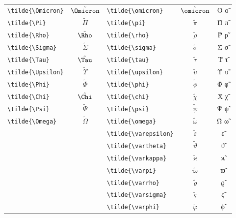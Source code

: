 \documentclass[12pt,a4paper]{article}
\begin{document}
\begin{longtable}{|l|c|l|c|c|}
\verb|\tilde{\Omicron}|    & $\tilde{\Omicron}$ & \verb|\tilde{\omicron}|    & $\tilde{\omicron}$    & Ο̃ ο̃ \\
\verb|\tilde{\Pi}|         & $\tilde{\Pi}$      & \verb|\tilde{\pi}|         & $\tilde{\pi}$         & Π̃ π̃ \\
\verb|\tilde{\Rho}|        & $\tilde{\Rho}$     & \verb|\tilde{\rho}|        & $\tilde{\rho}$        & Ρ̃ ρ̃ \\
\verb|\tilde{\Sigma}|      & $\tilde{\Sigma}$   & \verb|\tilde{\sigma}|      & $\tilde{\sigma}$      & Σ̃ σ̃ \\
\verb|\tilde{\Tau}|        & $\tilde{\Tau}$     & \verb|\tilde{\tau}|        & $\tilde{\tau}$        & Τ̃ τ̃ \\
\verb|\tilde{\Upsilon}|    & $\tilde{\Upsilon}$ & \verb|\tilde{\upsilon}|    & $\tilde{\upsilon}$    & Υ̃ υ̃ \\
\verb|\tilde{\Phi}|        & $\tilde{\Phi}$     & \verb|\tilde{\phi}|        & $\tilde{\phi}$        & Φ̃ φ̃ \\
\verb|\tilde{\Chi}|        & $\tilde{\Chi}$     & \verb|\tilde{\chi}|        & $\tilde{\chi}$        & Χ̃ χ̃ \\
\verb|\tilde{\Psi}|        & $\tilde{\Psi}$     & \verb|\tilde{\psi}|        & $\tilde{\psi}$        & Ψ̃ ψ̃ \\
\verb|\tilde{\Omega}|      & $\tilde{\Omega}$   & \verb|\tilde{\omega}|      & $\tilde{\omega}$      & Ω̃ ω̃ \\
                           &                    & \verb|\tilde{\varepsilon}| & $\tilde{\varepsilon}$ & ε̃ \\
                           &                    & \verb|\tilde{\vartheta}|   & $\tilde{\vartheta}$   & ϑ̃ \\
                           &                    & \verb|\tilde{\varkappa}|   & $\tilde{\varkappa}$   & ϰ̃ \\
                           &                    & \verb|\tilde{\varpi}|      & $\tilde{\varpi}$      & ϖ̃ \\
                           &                    & \verb|\tilde{\varrho}|     & $\tilde{\varrho}$     & ϱ̃ \\
                           &                    & \verb|\tilde{\varsigma}|   & $\tilde{\varsigma}$   & ς̃ \\
                           &                    & \verb|\tilde{\varphi}|     & $\tilde{\varphi}$     & ϕ̃ \\
\hline
\end{longtable}
\end{document}
